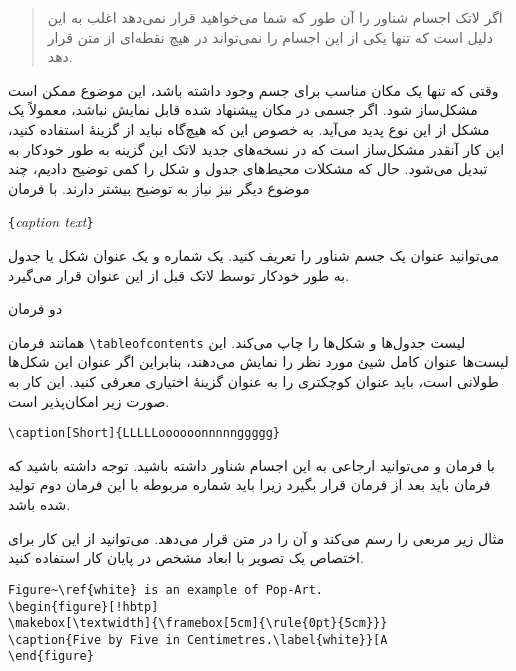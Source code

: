 \begin{quote}
اگر لاتک اجسام شناور را آن طور که شما می‌خواهید قرار نمی‌دهد اغلب به این دلیل است که تنها یکی از این اجسام را نمی‌تواند در هیچ نقطه‌ای از متن قرار دهد.
\end{quote}                 

وقتی که تنها یک مکان مناسب برای جسم وجود داشته باشد، این موضوع ممکن است مشکل‌\-ساز شود. اگر جسمی در مکان پیشنهاد شده قابل نمایش نباشد، 
معمولاً یک مشکل از این نوع پدید می‌آید. به خصوص این که هیچ‌گاه نباید از گزینهٔ 
\lr{[h]}
استفاده کنید، این کار آنقدر مشکل‌\-ساز است که در نسخه‌های جدید لاتک این گزینه به طور خودکار به 
\lr{[ht]}
تبدیل می‌شود.
\noindent حال که مشکلات محیط‌های جدول و شکل را کمی توضیح دادیم، چند موضوع دیگر نیز نیاز به توضیح بیشتر دارند. با فرمان


\begin{lscommand}
\verb|{|\emph{caption text}\verb|}|
\end{lscommand}

\noindent 
می‌توانید عنوان یک جسم شناور را تعریف کنید. یک شماره و یک عنوان شکل یا جدول به طور خودکار توسط لاتک قبل از این عنوان قرار می‌گیرد.

دو فرمان

\begin{lscommand}
   
\end{lscommand}

\noindent 
همانند فرمان 
\verb|\tableofcontents| 
لیست جدول‌ها و شکل‌ها را چاپ می‌کند. این لیست‌ها عنوان کامل شییٔ مورد نظر را نمایش می‌دهند، بنابراین اگر عنوان این شکل‌ها طولانی است، باید عنوان کوچکتری را به عنوان گزینهٔ اختیاری معرفی کنید. این کار به صورت زیر امکان‌پذیر است.

\begin{code}
\verb|\caption[Short]{LLLLLoooooonnnnnggggg}| 
\end{code}

با فرمان 
 و 
 می‌توانید ارجاعی به این اجسام شناور داشته باشید. توجه داشته باشید که فرمان 
باید بعد از فرمان 
 قرار بگیرد زیرا باید شماره مربوطه با این فرمان دوم تولید شده باشد.

مثال زیر مربعی را رسم می‌کند و آن را در متن قرار می‌دهد. می‌توانید از این کار برای اختصاص یک تصویر با ابعاد مشخص در پایان کار استفاده کنید.

\begin{code}
\begin{verbatim}
Figure~\ref{white} is an example of Pop-Art.
\begin{figure}[!hbtp]
\makebox[\textwidth]{\framebox[5cm]{\rule{0pt}{5cm}}}
\caption{Five by Five in Centimetres.\label{white}}[A
\end{figure}
\end{verbatim}
\end{code}


